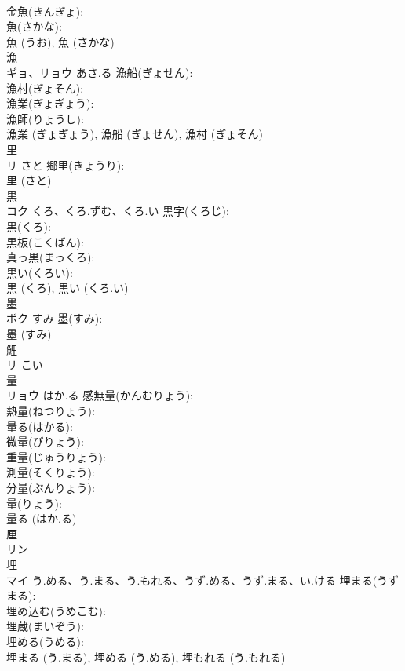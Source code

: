\documentclass[8pt]{extreport}
\begin{document}
\begin{CJK}{UTF8}{min}
\\	金魚(きんぎょ): 
\\	魚(さかな): 
\\	魚 (うお), 魚 (さかな)
\\	漁			
\\	ギョ、リョウ	あさ.る	漁船(ぎょせん): 
\\	漁村(ぎょそん): 
\\	漁業(ぎょぎょう): 
\\	漁師(りょうし): 
\\	漁業 (ぎょぎょう), 漁船 (ぎょせん), 漁村 (ぎょそん)
\\	里			
\\	リ	さと	郷里(きょうり): 
\\	里 (さと)
\\	黒			
\\	コク	くろ、くろ.ずむ、くろ.い	黒字(くろじ): 
\\	黒(くろ): 
\\	黒板(こくばん): 
\\	真っ黒(まっくろ): 
\\	黒い(くろい): 
\\	黒 (くろ), 黒い (くろ.い)
\\	墨			
\\	ボク	すみ	墨(すみ): 
\\	墨 (すみ)
\\	鯉			
\\	リ	こい		
\\	量			
\\	リョウ	はか.る	感無量(かんむりょう): 
\\	熱量(ねつりょう): 
\\	量る(はかる): 
\\	微量(びりょう): 
\\	重量(じゅうりょう): 
\\	測量(そくりょう): 
\\	分量(ぶんりょう): 
\\	量(りょう): 
\\	量る (はか.る)
\\	厘			
\\	リン			
\\	埋			
\\	マイ	う.める、う.まる、う.もれる、うず.める、うず.まる、い.ける	埋まる(うずまる): 
\\	埋め込む(うめこむ): 
\\	埋蔵(まいぞう): 
\\	埋める(うめる): 
\\	埋まる (う.まる), 埋める (う.める), 埋もれる (う.もれる)

\end{CJK}
\end{document}
